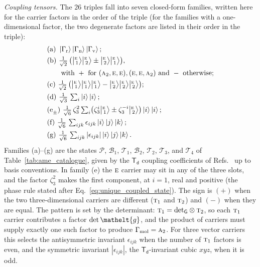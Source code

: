 \documentclass[
  reprint,
  aps,
  prx,
  superscriptaddress,
  amsmath,
  amssymb,
  longbibliography
]{revtex4-2}
\newcommand{\eltfont}[1]{{\let\sigma\eltsigma\mathelt{#1}}}
\newcommand{\grp}[1]{\mathsf{#1}}
\newcommand{\irr}[1]{\text{\normalfont\scshape #1}}
\newcommand{\elt}[1]{\eltfont{#1}}
\newcommand{\rootunity}[1]{\zeta_{#1}}
\newcommand{\irket}[2]{\bigl\lvert{}^{#1}_{\,#2}\bigr\rangle}
\newcommand{\gel}{\elt{g}}             %
\providecommand{\Gmol}{\Gamma_{\mathrm{mol}}}
\providecommand{\Grot}{\Gamma_{\mathrm{r}}}
\providecommand{\Gvib}{\Gamma_{\mathrm{v}}}
\providecommand{\Gspin}{\Gamma_{\mathrm{n}}}
\newcommand{\catP}{\mathcal{P}}
\newcommand{\catB}[1]{\mathcal{B}_{#1}}
\newcommand{\catT}[1]{\mathcal{T}_{#1}}
\begin{document}
\emph{Coupling tensors.} The $26$ triples fall into seven closed-form families, written here for the carrier factors in the order of the triple (for the families with a one-dimensional factor, the two degenerate factors are listed in their order in the triple):
\begin{align}
&\text{(a)}\ \ket{\Grot}\ket{\Gspin}\ket{\Gvib};\nonumber\\
&\text{(b)}\ \tfrac{1}{\sqrt{2}}\,\bigl(\irket{\irr{e}}{1}\irket{\irr{e}}{2}\pm\irket{\irr{e}}{2}\irket{\irr{e}}{1}\bigr),\nonumber\\
&\qquad\text{with }+\text{ for }(\irr{a}_{2},\irr{e},\irr{e}),(\irr{e},\irr{e},\irr{a}_{2})\text{ and }-\text{ otherwise};\nonumber\\
&\text{(c)}\ \tfrac{1}{\sqrt{2}}\,\bigl(\irket{\irr{e}}{1}\irket{\irr{e}}{1}\irket{\irr{e}}{1}-\irket{\irr{e}}{2}\irket{\irr{e}}{2}\irket{\irr{e}}{2}\bigr);\nonumber\\
&\text{(d)}\ \tfrac{1}{\sqrt{3}}\,\textstyle\sum_i\ket{i}\ket{i};\nonumber\\
&\text{(e}_\pm\text{)}\ \tfrac{1}{\sqrt{6}}\,\rootunity{3}^{2}\textstyle\sum_i\bigl(\rootunity{3}^{i}\irket{\irr{e}}{1}\pm\rootunity{3}^{-i}\irket{\irr{e}}{2}\bigr)\ket{i}\ket{i};\nonumber\\
&\text{(f)}\ \tfrac{1}{\sqrt{6}}\,\textstyle\sum_{ijk}\epsilon_{ijk}\ket{i}\ket{j}\ket{k};\nonumber\\
&\text{(g)}\ \tfrac{1}{\sqrt{6}}\,\textstyle\sum_{ijk}|\epsilon_{ijk}|\ket{i}\ket{j}\ket{k}.
\label{eq:td_tensors}
\end{align}
Families (a)--(g) are the states $\catP$, $\catB{1}$, $\catT{1}$, $\catB{2}$, $\catT{2}$, $\catT{3}$, and $\catT{4}$ of Table~\ref{tab:ame_catalogue}, given by the $\grp{T_{d}}$ coupling coefficients of Refs.~\cite{MoretBailly1965, Champion1977} up to basis conventions. In family (e) the $\irr{e}$ carrier may sit in any of the three slots, and the factor $\rootunity{3}^{2}$ makes the first component, at $i=1$, real and positive (the phase rule stated after Eq.~\eqref{eq:unique_coupled_state}). The sign is $(+)$ when the two three-dimensional carriers are different ($\irr{t}_{1}$ and $\irr{t}_{2}$) and $(-)$ when they are equal. The pattern is set by the determinant: $\irr{t}_{1}={\det_{\grp{G}}}\otimes \irr{t}_{2}$, so each $\irr{t}_{1}$ carrier contributes a factor $\det \gel$, and the product of carriers must supply exactly one such factor to produce $\Gmol=\irr{a}_{2}$. For three vector carriers this selects the antisymmetric invariant $\epsilon_{ijk}$ when the number of $\irr{t}_{1}$ factors is even, and the symmetric invariant $|\epsilon_{ijk}|$, the $\grp{T_{d}}$-invariant cubic $xyz$, when it is odd.
\end{document}
